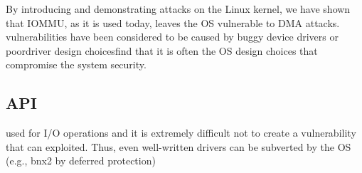 By introducing and demonstrating \compound{} attacks on the Linux kernel, we have shown that IOMMU, as it is used today, leaves the OS vulnerable to DMA attacks. \DIFdelbegin {}\DIFdelend \DIFaddbegin {}\DIFaddend vulnerabilities have been considered to be caused by buggy device drivers or poor\DIFdelbegin {}\DIFdelend \DIFaddbegin {}\DIFaddend driver design choices\DIFdelbegin {}\DIFdelend \DIFaddbegin {}\DIFaddend find that it is often the OS design choices that compromise the system security.
\DIFdelbegin {}%
\DIFdelend %

\subsection{API}\label{sec:api}

\DIFdelbegin {}\DIFdelend \DIFaddbegin {}\DIFaddend used for I/O operations and \DIFdelbegin {}\DIFdelend \DIFaddbegin {}\DIFaddend it is extremely difficult not to create a \subpage{} vulnerability that can \DIFdelbegin {}\DIFdelend \DIFaddbegin {}\DIFaddend exploited. Thus, even well-written drivers can be subverted by the OS (e.g., bnx2 by deferred protection)\DIFdelbegin {}\DIFdelend \DIFaddbegin {}\DIFaddend 

